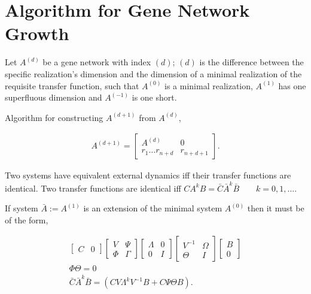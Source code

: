 \documentclass[11 pt]{article}
\begin{document}
\section{Algorithm for Gene Network Growth}

Let $A^(d)$ be a gene network with index $(d)$; $(d)$ is the difference between the specific realization's dimension and the dimension of a minimal realization of the requisite transfer function, such that $A^{(0)}$ is a minimal realization, $A^{(1)}$ has one superfluous dimension and $A^{(-1)}$ is one short.

Algorithm for constructing $A^{(d+1)}$ from $A^{(d)}$, 

\begin{align*}
  A^{(d+1)} = \left[ 
  \begin{array}{c|c}
    A^{(d)} & 0 \\
    r_{1} \dots r_{n+d} & r_{n+d+1}
  \end{array}
  \right].
  \end{align*}


  Two systems have equivalent external dynamics iff their transfer functions are identical. Two transfer functions are identical iff $CA^{k}B = \bar{C}\bar{A}^{k}\bar{B} \qquad k = 0, 1, \dots$.

  If system $\bar{A} := A^{(1)}$ is an extension of the minimal system $A^{(0)}$ then it must be of the form, 

  \begin{align*}
    \left[ \begin{array}{c|c} C & 0 \end{array} \right]
      \left[ \begin{array}{cc} V & \Psi \\ \Phi & \Gamma \end{array} \right]
        \left[ \begin{array}{cc} \Lambda & 0 \\ 0 & I \end{array} \right]
          \left[ \begin{array}{cc} V^{-1} & \Omega \\ \Theta & I \end{array} \right]
            \left[ \begin{array}{cc} B \\ \hline 0 \end{array} \right] \\
              \Phi \Theta = 0  \\
              \bar{C} \bar{A}^{k} \bar{B} = (CV\Lambda^{k}V^{-1}B + C \Psi \Theta B).
  \end{align*}
\end{document}
